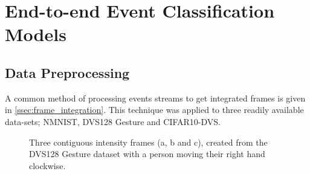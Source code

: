 \color{black}

\section{End-to-end Event Classification Models}

\subsection{Data Preprocessing}

A common method of processing events streams to get integrated frames is given in \cref{ssec:frame_integration}. This technique was applied to three readily available data-sets; NMNIST, DVS128 Gesture and CIFAR10-DVS.

\begin{figure}[htb]%
    \centering
    \qquad
    \qquad
    \caption{Three contiguous intensity frames ({a}, {b} and {c}), created from the DVS128 Gesture dataset with a person moving their right hand clockwise.}%
    \label{fig:dvs128_integrated_frames}%
\end{figure}

